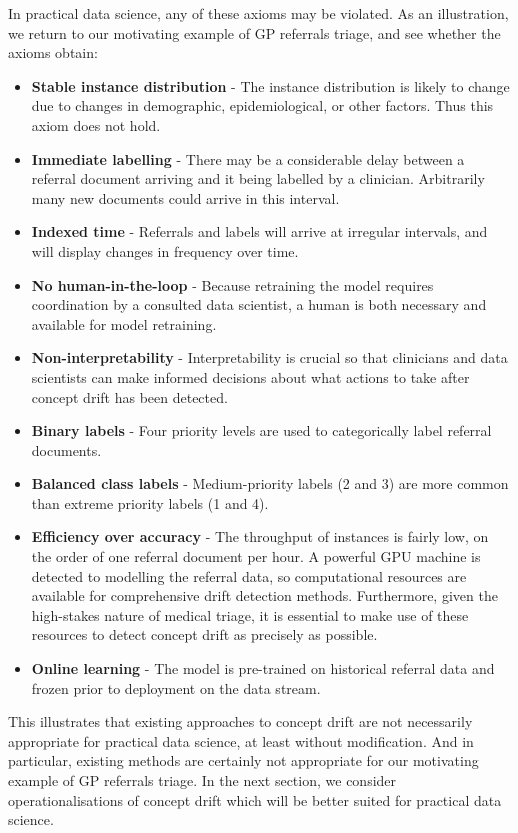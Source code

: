 In practical data science, any of these axioms may be violated. As an illustration, we return to our motivating example of  GP referrals triage, and see whether the axioms obtain:
\begin{itemize}
  \item {\bf Stable instance distribution} - The instance distribution is likely to change due to changes in demographic, epidemiological, or other factors. Thus this axiom does not hold.
  \item {\bf Immediate labelling} - There may be a considerable delay between a referral document arriving and it being labelled by a clinician. Arbitrarily many new documents could arrive in this interval.
  \item {\bf Indexed time} - Referrals and labels will arrive at irregular intervals, and will display changes in frequency over time.
  \item {\bf No human-in-the-loop} - Because retraining the model requires coordination by a consulted data scientist, a human is both necessary and available for model retraining.
  \item {\bf Non-interpretability} - Interpretability is crucial so that clinicians and data scientists can make informed decisions about what actions to take after concept drift has been detected.
  \item {\bf Binary labels} - Four priority levels are used to categorically label referral documents.
  \item {\bf Balanced class labels} - Medium-priority labels (2 and 3) are more common than extreme priority labels (1 and 4).
  \item {\bf Efficiency over accuracy} - The throughput of instances is fairly low, on the order of one referral document per hour. A powerful GPU machine is detected to modelling the referral data, so computational resources are available for comprehensive drift detection methods. Furthermore, given the high-stakes nature of medical triage, it is essential to make use of these resources to detect concept drift as precisely as possible.
  \item {\bf Online learning} - The model is pre-trained on historical referral data and frozen prior to deployment on the data stream.
\end{itemize}

This illustrates that existing approaches to concept drift are not necessarily appropriate for practical data science, at least without modification. And in particular, existing methods are certainly not appropriate for our motivating example of GP referrals triage. In the next section, we consider operationalisations of concept drift which will be better suited for practical data science.

